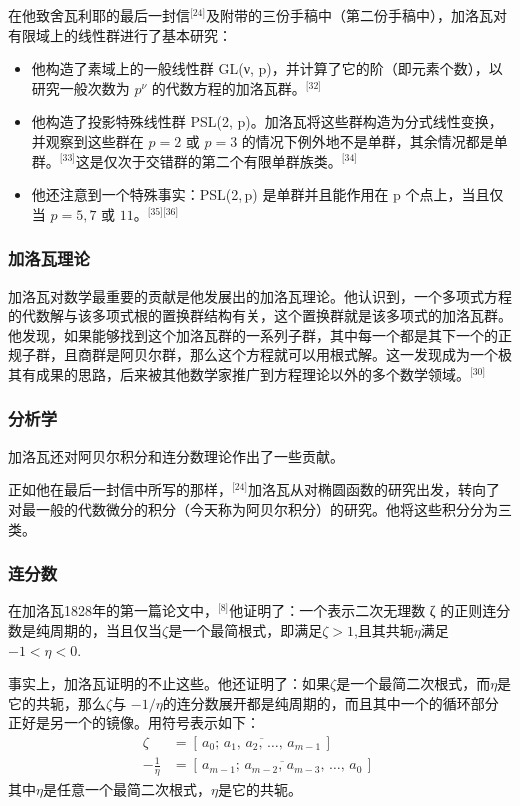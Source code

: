 在他致舍瓦利耶的最后一封信\(^\text{[24]}\)及附带的三份手稿中（第二份手稿中），加洛瓦对有限域上的线性群进行了基本研究：
\begin{itemize}
\item 他构造了素域上的一般线性群 GL(ν, p)，并计算了它的阶（即元素个数），以研究一般次数为 $p^\nu$ 的代数方程的加洛瓦群。\(^\text{[32]}\)
\item 他构造了投影特殊线性群 PSL(2, p)。加洛瓦将这些群构造为分式线性变换，并观察到这些群在 $p = 2$ 或 $p = 3$ 的情况下例外地不是单群，其余情况都是单群。\(^\text{[33]}\)这是仅次于交错群的第二个有限单群族类。\(^\text{[34]}\)
\item 他还注意到一个特殊事实：PSL(2, p) 是单群并且能作用在 p 个点上，当且仅当 $p = 5, 7$ 或 $11$。\(^\text{[35][36]}\)
\end{itemize}
\subsubsection{加洛瓦理论}
加洛瓦对数学最重要的贡献是他发展出的加洛瓦理论。他认识到，一个多项式方程的代数解与该多项式根的置换群结构有关，这个置换群就是该多项式的加洛瓦群。他发现，如果能够找到这个加洛瓦群的一系列子群，其中每一个都是其下一个的正规子群，且商群是阿贝尔群，那么这个方程就可以用根式解。这一发现成为一个极其有成果的思路，后来被其他数学家推广到方程理论以外的多个数学领域。\(^\text{[30]}\)
\subsubsection{分析学}
加洛瓦还对阿贝尔积分和连分数理论作出了一些贡献。

正如他在最后一封信中所写的那样，\(^\text{[24]}\)加洛瓦从对椭圆函数的研究出发，转向了对最一般的代数微分的积分（今天称为阿贝尔积分）的研究。他将这些积分分为三类。
\subsubsection{连分数}
在加洛瓦1828年的第一篇论文中，\(^\text{[8]}\)他证明了：一个表示二次无理数 ζ 的正则连分数是纯周期的，当且仅当$\zeta $是一个最简根式，即满足$\zeta > 1$,且其共轭$\eta$满足 $-1 < \eta < 0$.

事实上，加洛瓦证明的不止这些。他还证明了：如果$\zeta $是一个最简二次根式，而$\eta$是它的共轭，那么$\zeta $与 $-1/\eta$的连分数展开都是纯周期的，而且其中一个的循环部分正好是另一个的镜像。用符号表示如下：
$$
\begin{aligned}
\zeta &= [\,\overline{a_0;\,a_1,\,a_2,\,\dots,\,a_{m-1}}\,] \\
-\frac{1}{\eta} &= [\,\overline{a_{m-1};\,a_{m-2},\,a_{m-3},\,\dots,\,a_0}\,]
\end{aligned}~
$$
其中$\eta$是任意一个最简二次根式，$\eta$是它的共轭。

